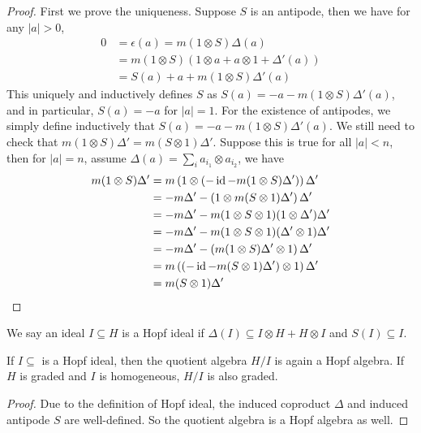 \begin{proof}
First we prove the uniqueness. Suppose $S$ is an antipode, then we have for any $|a|>0$,
\begin{equation}
\begin{aligned}
0&=\epsilon(a)=m(1\otimes S)\Delta(a)\\
&=m(1\otimes S)(1\otimes a + a\otimes 1 + \Delta'(a))\\
&=S(a) + a + m(1\otimes S)\Delta'(a)
\end{aligned}
\end{equation}
This uniquely and inductively defines $S$ as $S(a)=-a-m(1\otimes S)\Delta'(a)$, and in particular, $S(a)=-a$ for $|a|=1$. For the existence of antipodes, we simply define inductively that $S(a)=-a-m(1\otimes S)\Delta'(a)$. We still need to check that $m(1\otimes S)\Delta'=m(S\otimes 1)\Delta'$. Suppose this is true for all $|a|<n$, then for $|a|=n$, assume $\Delta(a)=\sum_ia_{i_1}\otimes a_{i_2}$, we have
\begin{equation}
\begin{aligned}
m(1\otimes S)\Delta'&=m\left(1\otimes\left(-\operatorname{id}-m(1\otimes S)\Delta'\right)\right)\Delta'\\
&=-m\Delta'-\left(1\otimes m(S\otimes 1)\Delta'\right)\Delta'\\
&=-m\Delta'-m(1\otimes S\otimes 1)(1\otimes\Delta')\Delta'\\
&=-m\Delta'-m(1\otimes S\otimes 1)(\Delta'\otimes1)\Delta'\\
&=-m\Delta'-\left(m(1\otimes S)\Delta'\otimes1\right)\Delta'\\
&=m\left(\left(-\operatorname{id}-m(S\otimes 1)\Delta'\right)\otimes1\right)\Delta'\\
&=m(S\otimes 1)\Delta'
\end{aligned}
\end{equation}
\end{proof}

\begin{definition}
We say an ideal $I\subseteq H$ is a Hopf ideal if $\Delta(I)\subseteq I\otimes H+H\otimes I$ and $S(I)\subseteq I$.
\end{definition}

\begin{proposition}\label{prop: quotient Hopf algebra}
If $I\subseteq$ is a Hopf ideal, then the quotient algebra $H/I$ is again a Hopf algebra. If $H$ is graded and $I$ is homogeneous, $H/I$ is also graded.
\end{proposition}

\begin{proof}
Due to the definition of Hopf ideal, the induced coproduct $\Delta$ and induced antipode $S$ are well-defined. So the quotient algebra is a Hopf algebra as well.
\end{proof}

